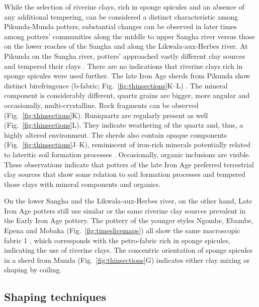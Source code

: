 \documentclass[smallextended,natbib]{svjour3}       %
\begin{document}
While the selection of riverine clays, rich in sponge spicules and an absence of any additional tempering, can be considered a distinct characteristic among Pikunda-Munda potters, substantial changes can be observed in later times among potters' communities along the middle to upper Sangha river versus those on the lower reaches of the Sangha and along the Likwala-aux-Herbes river. At Pikunda on the Sangha river, potters' approached vastly different clay sources and tempered their clays \citep{Seidensticker.2016b,Seidensticker.2020}. There are no indications that riverine clays rich in sponge spicules were used further. The late Iron Age sherds from Pikunda show distinct birefringence (b-fabric; Fig.~\ref{fig:thinsections}K--L) \citep[131-141]{Stoops.2021}. The mineral component is considerably different, quartz grains are bigger, more angular and occasionally, multi-crystalline. Rock fragments can be observed (Fig.~\ref{fig:thinsections}K). Runiquartz \citep[673 Fig.~6]{Marcelino.2018} are regularly present as well (Fig.~\ref{fig:thinsections}L). They indicate weathering of the quartz and, thus, a highly altered environment. The sherds also contain opaque components (Fig.~\ref{fig:thinsections}J--K), reminiscent of iron-rich minerals potentially related to lateritic soil formation processes \citep[351--352]{Scheffer.2010}. Occasionally, organic inclusions are visible. These observations indicate that potters of the late Iron Age preferred terrestrial clay sources that show some relation to soil formation processes and tempered those clays with mineral components and organics.

On the lower Sangha and the Likwala-aux-Herbes river, on the other hand, Late Iron Age potters still use similar or the same riverine clay sources prevalent in the Early Iron Age pottery. The pottery of the younger styles Ngombe, Ebambe, Epena and Mobaka (Fig.~\ref{fig:timeslicemaps}) all show the same macroscopic fabric 1 \citep[69 Tab.~12]{Seidensticker.2021e}, which corresponds with the petro-fabric rich in sponge spicules, indicating the use of riverine clays. The concentric orientation of sponge spicules in a sherd from Munda (Fig.~\ref{fig:thinsections}G) indicates either clay mixing or shaping by coiling.

\subsection{Shaping techniques}
\end{document}
